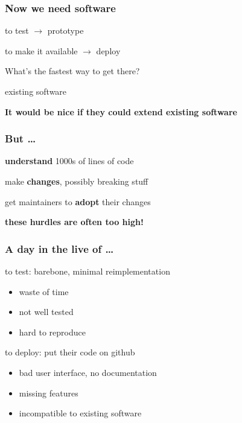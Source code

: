 \documentclass{beamer}
\newenvironment{wideitemize}{
    \itemize\addtolength{\itemsep}{15pt}\addtolength{\topsep}{10pt}}{\enditemize}
\begin{document}
    \begin{frame}
        \frametitle{Now we need software}
        \begin{wideitemize}
            \item to test $\to$ prototype
            \item to make it available $\to$ deploy
        \end{wideitemize}

    \vspace{0.5cm}

    What's the fastest way to get there?

    \vspace{0.5cm}

    existing software

    \vspace{0.5cm}

    \textbf{It would be nice if they could extend existing software}
    \end{frame}

    \begin{frame}
        \frametitle{But \ldots}
        \begin{wideitemize}
            \item \textbf{understand} 1000s of lines of code
            \item make \textbf{changes}, possibly breaking stuff
            \item get maintainers to \textbf{adopt} their changes
        \end{wideitemize}

        \vspace{1cm}

        \textbf{these hurdles are often too high!}
    \end{frame}

    \begin{frame}
        \frametitle{A day in the live of \ldots}
        \vspace{0.8cm}
        \begin{wideitemize}
            \item to test: barebone, minimal reimplementation
            \begin{itemize}
                \item waste of time
                \item not well tested
                \item hard to reproduce
            \end{itemize}
            \item to deploy: put their code on github
            \begin{itemize}
                \item bad user interface, no documentation
                \item missing features
                \item incompatible to existing software
            \end{itemize}
        \end{wideitemize}
    \end{frame}
\end{document}
